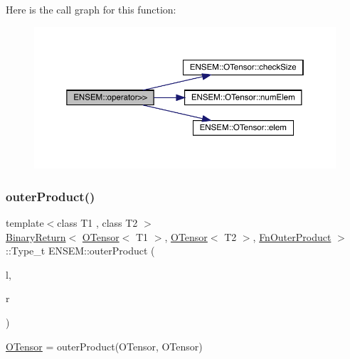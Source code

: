 Here is the call graph for this function\+:\nopagebreak
\begin{figure}[H]
\begin{center}
\leavevmode
\includegraphics[width=350pt]{de/d87/group__obstensor_ga605e67dfa1237293bf39540ec4000032_cgraph}
\end{center}
\end{figure}
\mbox{\label{group__obstensor_ga89521e9a934b14066eac700fe2539b53}} 
\subsubsection{\texorpdfstring{outerProduct()}{outerProduct()}\hspace{0.1cm}{\footnotesize\ttfamily [1/3]}}
{\footnotesize\ttfamily template$<$class T1 , class T2 $>$ \\
\mbox{\hyperlink{structENSEM_1_1BinaryReturn}{Binary\+Return}}$<$ \mbox{\hyperlink{classENSEM_1_1OTensor}{O\+Tensor}}$<$ T1 $>$, \mbox{\hyperlink{classENSEM_1_1OTensor}{O\+Tensor}}$<$ T2 $>$, \mbox{\hyperlink{structENSEM_1_1FnOuterProduct}{Fn\+Outer\+Product}} $>$\+::Type\+\_\+t E\+N\+S\+E\+M\+::outer\+Product (\begin{DoxyParamCaption}\item[{const \mbox{\hyperlink{classENSEM_1_1OTensor}{O\+Tensor}}$<$ T1 $>$ \&}]{l,  }\item[{const \mbox{\hyperlink{classENSEM_1_1OTensor}{O\+Tensor}}$<$ T2 $>$ \&}]{r }\end{DoxyParamCaption})\hspace{0.3cm}{\ttfamily [inline]}}



\mbox{\hyperlink{classENSEM_1_1OTensor}{O\+Tensor}} = outer\+Product(\+O\+Tensor, O\+Tensor) 

